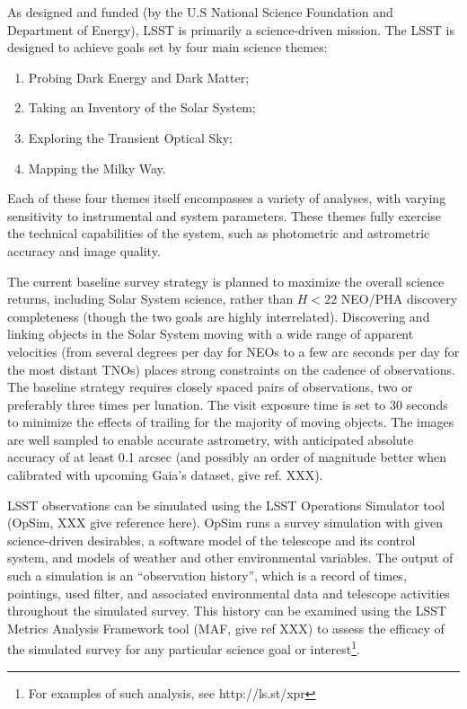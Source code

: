 As designed and funded (by the U.S National Science Foundation and
Department of Energy), LSST is primarily a science-driven mission. 
The LSST is designed to achieve goals set by four main science themes:
\begin{enumerate}
\item Probing Dark Energy and Dark Matter;
\item Taking an Inventory of the Solar System;
\item Exploring the Transient Optical Sky;
\item Mapping the Milky Way.
\end{enumerate}
Each of these four themes itself encompasses a variety of analyses, with 
varying sensitivity to instrumental and system parameters. These themes 
fully exercise the technical capabilities of the system, such as photometric 
and astrometric accuracy and image quality. 

The current baseline survey strategy is planned to maximize the overall science returns, including 
Solar System science, rather than $H<22$ NEO/PHA discovery completeness (though the 
two goals are highly interrelated). Discovering and linking objects in the Solar System 
moving with a wide range of apparent velocities (from several degrees per day for 
NEOs to a few arc seconds per day for the most distant TNOs) places strong 
constraints on the cadence of observations. The baseline strategy requires closely 
spaced pairs of observations, two or preferably three times per lunation. The visit
exposure time is set to 30 seconds to minimize the effects of trailing for the majority of 
moving objects. The images are well sampled to enable accurate astrometry, with 
anticipated absolute accuracy of at least 0.1 arcsec (and possibly an order of magnitude
better when calibrated with upcoming Gaia's dataset, give ref. XXX). 

LSST observations can be simulated using the LSST Operations Simulator tool (OpSim, XXX give
reference here). OpSim runs a survey simulation with given science-driven desirables, 
a software model of the telescope and its control system, and models of weather and other 
environmental variables. The output of such a simulation is an ``observation history'', which 
is a record of times, pointings, used filter, and associated environmental data and telescope  
activities throughout the simulated survey.  This history can be examined using the LSST 
Metrics Analysis Framework tool (MAF, give ref XXX) to assess  
the efficacy of the simulated survey for any particular science goal or 
interest\footnote{For examples of such analysis, see http://ls.st/xpr}. 


